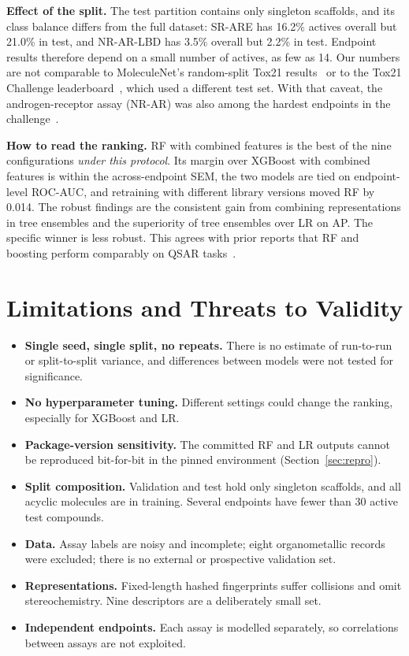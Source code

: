 \documentclass[conference]{IEEEtran}
\begin{document}
\textbf{Effect of the split.} The test partition contains only singleton scaffolds, and its class balance differs from the full dataset: SR-ARE has 16.2\% actives overall but 21.0\% in test, and NR-AR-LBD has 3.5\% overall but 2.2\% in test. Endpoint results therefore depend on a small number of actives, as few as 14. Our numbers are not comparable to MoleculeNet's random-split Tox21 results~\cite{wu2018moleculenet} or to the Tox21 Challenge leaderboard~\cite{huang2016tox21}, which used a different test set. With that caveat, the androgen-receptor assay (NR-AR) was also among the hardest endpoints in the challenge~\cite{huang2016tox21}.

\textbf{How to read the ranking.} RF with combined features is the best of the nine configurations \emph{under this protocol}. Its margin over XGBoost with combined features is within the across-endpoint SEM, the two models are tied on endpoint-level ROC-AUC, and retraining with different library versions moved RF by 0.014. The robust findings are the consistent gain from combining representations in tree ensembles and the superiority of tree ensembles over LR on AP. The specific winner is less robust. This agrees with prior reports that RF and boosting perform comparably on QSAR tasks~\cite{svetnik2005boosting,jiang2021could}.

\section{Limitations and Threats to Validity}
\begin{itemize}
\item \textbf{Single seed, single split, no repeats.} There is no estimate of run-to-run or split-to-split variance, and differences between models were not tested for significance.
\item \textbf{No hyperparameter tuning.} Different settings could change the ranking, especially for XGBoost and LR.
\item \textbf{Package-version sensitivity.} The committed RF and LR outputs cannot be reproduced bit-for-bit in the pinned environment (Section~\ref{sec:repro}).
\item \textbf{Split composition.} Validation and test hold only singleton scaffolds, and all acyclic molecules are in training. Several endpoints have fewer than 30 active test compounds.
\item \textbf{Data.} Assay labels are noisy and incomplete; eight organometallic records were excluded; there is no external or prospective validation set.
\item \textbf{Representations.} Fixed-length hashed fingerprints suffer collisions and omit stereochemistry. Nine descriptors are a deliberately small set.
\item \textbf{Independent endpoints.} Each assay is modelled separately, so correlations between assays are not exploited.
\end{itemize}
\end{document}
